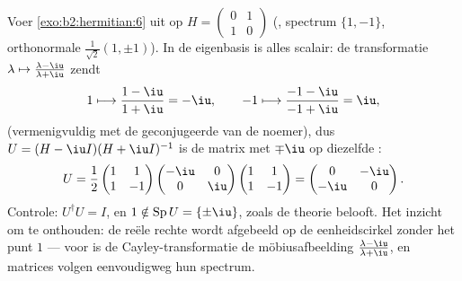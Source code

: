 \begin{example}\label{ex:b2:hermitian:cayleyrun}
Voer \cref{exo:b2:hermitian:6} uit op $H = \begin{pmatrix} 0 & 1\\
1 & 0\end{pmatrix}$ (, spectrum $\{1, -1\}$, orthonormale
 $\frac{1}{\sqrt2}(1, \pm1)$). In de eigenbasis is
alles scalair: de transformatie $\lambda \mapsto \frac{\lambda -
\iu}{\lambda + \iu}$ zendt
\[
1 \longmapsto \frac{1 - \iu}{1 + \iu} = -\iu,
\qquad
-1 \longmapsto \frac{-1 - \iu}{-1 + \iu} = \iu ,
\]
(vermenigvuldig met de geconjugeerde van de noemer), dus $U = (H -
\iu I)(H + \iu I)^{-1}$ is de  matrix met 
$\mp\iu$ op diezelfde :
\[
U = \frac{1}{2}\begin{pmatrix} 1 & 1\\ 1 & -1\end{pmatrix}
\begin{pmatrix} -\iu & 0\\ 0 & \iu\end{pmatrix}
\begin{pmatrix} 1 & 1\\ 1 & -1\end{pmatrix}
= \begin{pmatrix} 0 & -\iu\\ -\iu & 0\end{pmatrix} .
\]
Controle: $U^\dagger U = I$, en $1 \notin \operatorname{Sp}U =
\{\pm\iu\}$, zoals de theorie belooft. Het inzicht om te onthouden:
de reële rechte wordt afgebeeld op de eenheidscirkel zonder het
punt $1$ ---  voor  is de
Cayley-transformatie de möbiusafbeelding
$\frac{\lambda-\iu}{\lambda+\iu}$, en matrices volgen eenvoudigweg
hun spectrum.
\end{example}


